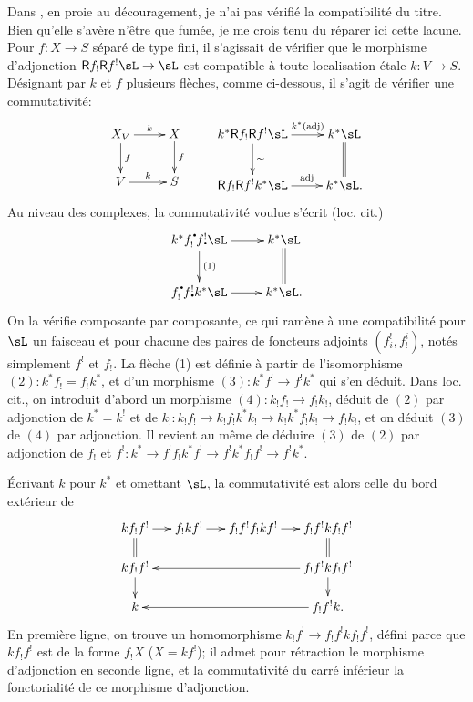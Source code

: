 Dans \cite[XVIII]{sga4}, en proie au découragement, je n'ai pas vérifié 
la compatibilité du titre. Bien qu'elle s'avère n'être que fumée, je me 
crois tenu du réparer ici cette lacune. Pour $f:X\to S$ séparé de type 
fini, il s'agissait de vérifier que le morphisme d'adjonction 
$\R f_!\R f^!\sL\to \sL$ est compatible à toute localisation étale 
$k:V\to S$. Désignant par $k$ et $f$ plusieurs flèches, comme ci-dessous, 
il s'agit de vérifier une commutativité:
\[\xymatrix{
  X_V \ar[r]^-k \ar[d]^-f 
    & X \ar[d]^-f \\
  V \ar[r]^-k 
    & S 
} \qquad 
\xymatrix{
  k^\ast \R f_! \R f^!\sL \ar[r]^-{k^\ast(\text{adj})} \ar[d]^-\sim 
    & k^\ast \sL \ar@{=}[d] \\
  \R f_! \R f^! k^\ast \sL \ar[r]^-{\text{adj}} 
    & k^\ast \sL \text{.}
}\]
Au niveau des complexes, la commutativité voulue s'écrit (loc. cit.) 
\[\xymatrix{
  k^\ast f_!^\bullet f^!_\bullet \sL \ar[r] \ar[d]^-{(1)} 
    & k^\ast \sL \ar@{=}[d] \\
  f_!^\bullet f^!_\bullet k^\ast \sL \ar[r] 
    & k^\ast \sL \text{.}
}\]
On la vérifie composante par composante, ce qui ramène à une 
compatibilité pour $\sL$ un faisceau et pour chacune des paires de foncteurs 
adjoints $(f_i^!,f_!^i)$, notés simplement $f^!$ et $f_!$. La flèche (1) 
est définie à partir de l'isomorphisme $(2):k^\ast f_!=f_! k^\ast$, et d'un 
morphisme $(3):k^\ast f^! \to f^! k^\ast$ qui s'en déduit. Dans loc. cit., on 
introduit d'abord un morphisme $(4):k_! f_!\to f_! k_!$, déduit de $(2)$ par 
adjonction de $k^\ast=k^!$ et de 
$k_!:k_! f_!\to k_! f_! k^\ast k_!\to k_! k^\ast f_! k_! \to f_! k_!$, et on 
déduit $(3)$ de $(4)$ par adjonction. Il revient au même de déduire $(3)$ 
de $(2)$ par adjonction de $f_!$ et 
$f^!:k^\ast \to f^! f_! k^\ast f^!\to f^! k^\ast f_! f^! \to f^! k^\ast$. 

Écrivant $k$ pour $k^\ast$ et omettant $\sL$, la commutativité est alors 
celle du bord extérieur de 
\[\xymatrix@=.5cm{
  k f_! f^! \ar[r] \ar@{=}[d]
    & f_! k f^! \ar[r] 
    & f_! f^! f_! k f^! \ar[r] 
    & f_! f^! k f_! f^! \ar@{=}[d] \\
  k f_! f^! \ar[d] 
    & & & \ar[lll] f_! f^! k f_! f^! \ar[d] \\
  k 
    & & & \ar[lll] f_! f^! k \text{.}
}\]
En première ligne, on trouve un homomorphisme 
$k _! f^! \to f_! f^! k f_! f^!$, défini parce que $k f_! f^!$ est de la 
forme $f_! X$ ($X=k f^!$); il admet pour rétraction le morphisme 
d'adjonction en seconde ligne, et la commutativité du carré inférieur la 
fonctorialité de ce morphisme d'adjonction. 




